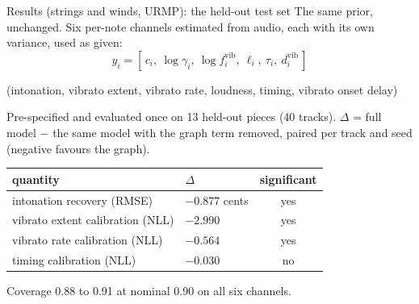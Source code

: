 \documentclass[aspectratio=169,11pt]{beamer}
\begin{document}
\begin{frame}{Results (strings and winds, URMP): the held-out test set}
  The same prior, unchanged. Six per-note channels estimated from audio,
  each with its own variance, used as given:
  \begin{equation*}
    y_i = [\, c_i,\ \log\gamma_i,\ \log f_i^{\mathrm{vib}},\ \ell_i,\ \tau_i,\ d_i^{\mathrm{vib}} \,]
  \end{equation*}
  \vspace{-3mm}
  {\small (intonation, vibrato extent, vibrato rate, loudness, timing,
  vibrato onset delay)\par}
  Pre-specified and evaluated once on 13 held-out pieces (40 tracks).
  $\Delta$ = full model $-$ the same model with the graph term removed,
  paired per track and seed (negative favours the graph).
  \begin{center}
  \small
  \begin{tabular}{@{}llc@{}}
    \toprule
    quantity & $\Delta$ & significant \\
    \midrule
    intonation recovery (RMSE) & $-0.877$ cents & yes \\
    vibrato extent calibration (NLL) & $-2.990$ & yes \\
    vibrato rate calibration (NLL) & $-0.564$ & yes \\
    timing calibration (NLL) & $-0.030$ & no \\
    \bottomrule
  \end{tabular}
  \end{center}
  Coverage 0.88 to 0.91 at nominal 0.90 on all six channels.
\end{frame}
\end{document}
